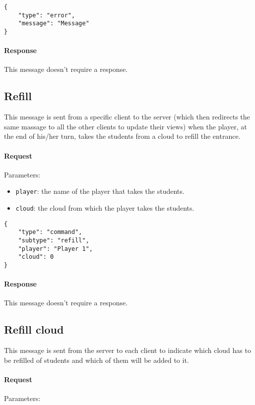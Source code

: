 \documentclass[a4paper]{article}
\begin{document}
	\begin{verbatim}
{
	"type": "error",
	"message": "Message"
}
	\end{verbatim}

	\paragraph{Response} This message doesn't require a response.

	\subsection{Refill}

	This message is sent from a specific client to the server (which then redirects the same massage to all the other clients to update their views) when the player, at the end of his/her turn, takes the students from a cloud to refill the entrance.
	
	\paragraph{Request} Parameters:
	
	\begin{itemize}
		\item \verb|player|: the name of the player that takes the students.
		\item \verb|cloud|: the cloud from which the player takes the students.
	\end{itemize}
	
	\begin{verbatim}
{
	"type": "command",
	"subtype": "refill",
	"player": "Player 1",
	"cloud": 0
}
	\end{verbatim}
	
	\paragraph{Response} This message doesn't require a response.
	
	\subsection{Refill cloud}
	
	This message is sent from the server to each client to indicate which cloud has to be refilled of students and which of them will be added to it.
	
	\paragraph{Request} Parameters:
\end{document}
